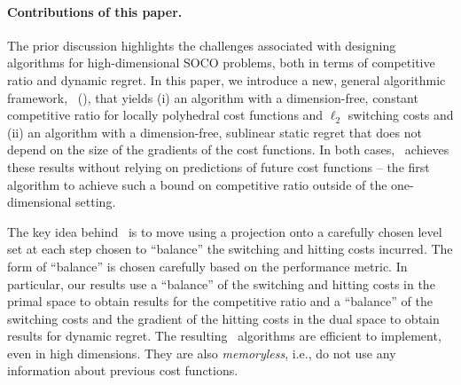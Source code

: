 \paragraph{Contributions of this paper.} The prior discussion highlights the challenges associated with designing algorithms for high-dimensional SOCO problems,
both in terms of competitive ratio and dynamic regret.  In this paper, we introduce a new, general algorithmic framework, \ouralg\ (\ourack), that yields (i) an algorithm with a dimension-free, constant competitive ratio for locally polyhedral cost functions and $\ell_2$ switching costs and (ii) an algorithm with a dimension-free, sublinear static regret that does not depend on the size of the gradients of the cost functions. In both cases, \ourack\ achieves these results without relying on predictions of future cost functions -- the first algorithm to achieve such a bound on competitive ratio outside of the one-dimensional setting.

The key idea behind \ourack\ is %
to move using a projection onto a carefully chosen level set at each step chosen to ``balance'' the switching and hitting costs incurred.  The 
form of ``balance'' is chosen carefully based on the performance metric.  In particular, our results use a ``balance'' of the switching and hitting costs in the primal space to obtain results for the competitive ratio and a ``balance''  of the switching costs and the gradient of the hitting costs in the dual space to obtain results for dynamic regret. The resulting \ourack\ algorithms are efficient to implement, even in high dimensions. They are also \emph{memoryless}, i.e., do not use any information about previous cost functions. 

